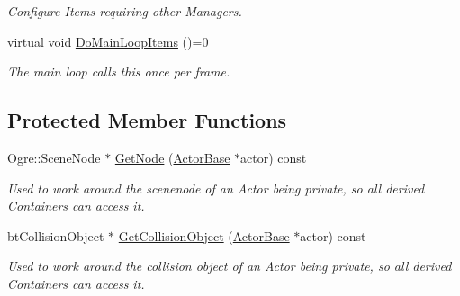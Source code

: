 \begin{DoxyCompactItemize}
\begin{DoxyCompactList}\small\item\em Configure Items requiring other Managers. \item\end{DoxyCompactList}\item 
virtual void \hyperlink{classphys_1_1ActorContainerBase_a67fbde6a61602253f66fecd0416bdc2f}{DoMainLoopItems} ()=0
\begin{DoxyCompactList}\small\item\em The main loop calls this once per frame. \item\end{DoxyCompactList}\end{DoxyCompactItemize}
\subsection*{Protected Member Functions}
\begin{DoxyCompactItemize}
\item 
Ogre::SceneNode $\ast$ \hyperlink{classphys_1_1ActorContainerBase_a44adf1174e624d9fa1408c9885f9ea12}{GetNode} (\hyperlink{classphys_1_1ActorBase}{ActorBase} $\ast$actor) const 
\begin{DoxyCompactList}\small\item\em Used to work around the scenenode of an Actor being private, so all derived Containers can access it. \item\end{DoxyCompactList}\item 
btCollisionObject $\ast$ \hyperlink{classphys_1_1ActorContainerBase_a3f3d84f7775d2e8597290e214fedd5f9}{GetCollisionObject} (\hyperlink{classphys_1_1ActorBase}{ActorBase} $\ast$actor) const 
\begin{DoxyCompactList}\small\item\em Used to work around the collision object of an Actor being private, so all derived Containers can access it. \item\end{DoxyCompactList}\end{DoxyCompactItemize}


